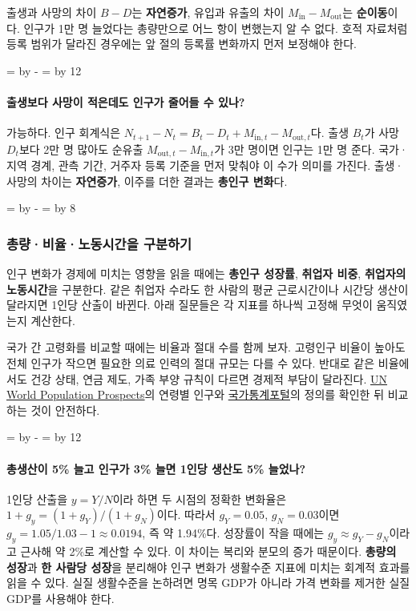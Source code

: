 \documentclass[10pt,a4paper]{article}
\newcommand{\ReserveQuestionSpace}{%
  \par\begingroup
  \dimen0=\pagegoal \advance\dimen0 by -\pagetotal
  \dimen2=\baselineskip \multiply\dimen2 by 12
  \ifdim\dimen0<\dimen2 \newpage\fi
  \endgroup}
\newcommand{\ReserveReadingSectionSpace}{%
  \par\begingroup
  \dimen0=\pagegoal \advance\dimen0 by -\pagetotal
  \dimen2=\baselineskip \multiply\dimen2 by 8
  \ifdim\dimen0<\dimen2 \newpage\fi
  \endgroup}
\begin{document}
출생과 사망의 차이 $B-D$는 \textbf{자연증가}, 유입과 유출의 차이 $M_{\mathrm{in}}-M_{\mathrm{out}}$는 \textbf{순이동}이다. 인구가 1만 명 늘었다는 총량만으로 어느 항이 변했는지 알 수 없다. 호적 자료처럼 등록 범위가 달라진 경우에는 앞 절의 등록률 변화까지 먼저 보정해야 한다.\par

\ReserveQuestionSpace
\paragraph{출생보다 사망이 적은데도 인구가 줄어들 수 있나?}
가능하다. 인구 회계식은 $N_{t+1}-N_t=B_t-D_t+M_{\mathrm{in},t}-M_{\mathrm{out},t}$다. 출생 $B_t$가 사망 $D_t$보다 2만 명 많아도 순유출 $M_{\mathrm{out},t}-M_{\mathrm{in},t}$가 3만 명이면 인구는 1만 명 준다. 국가·지역 경계, 관측 기간, 거주자 등록 기준을 먼저 맞춰야 이 수가 의미를 가진다. 출생·사망의 차이는 \textbf{자연증가}, 이주를 더한 결과는 \textbf{총인구 변화}다.\par

\ReserveReadingSectionSpace
\subsubsection*{총량·비율·노동시간을 구분하기}

인구 변화가 경제에 미치는 영향을 읽을 때에는 \textbf{총인구 성장률}, \textbf{취업자 비중}, \textbf{취업자의 노동시간}을 구분한다. 같은 취업자 수라도 한 사람의 평균 근로시간이나 시간당 생산이 달라지면 1인당 산출이 바뀐다. 아래 질문들은 각 지표를 하나씩 고정해 무엇이 움직였는지 계산한다.\par

국가 간 고령화를 비교할 때에는 비율과 절대 수를 함께 보자. 고령인구 비율이 높아도 전체 인구가 작으면 필요한 의료 인력의 절대 규모는 다를 수 있다. 반대로 같은 비율에서도 건강 상태, 연금 제도, 가족 부양 규칙이 다르면 경제적 부담이 달라진다. \href{https://population.un.org/wpp/}{UN World Population Prospects}의 연령별 인구와 \href{https://kosis.kr/}{국가통계포털}의 정의를 확인한 뒤 비교하는 것이 안전하다.\par

\ReserveQuestionSpace
\paragraph{총생산이 5\% 늘고 인구가 3\% 늘면 1인당 생산도 5\% 늘었나?}
1인당 산출을 $y=Y/N$이라 하면 두 시점의 정확한 변화율은 $1+g_y=(1+g_Y)/(1+g_N)$이다. 따라서 $g_Y=0.05$, $g_N=0.03$이면 $g_y=1.05/1.03-1\approx0.0194$, 즉 약 1.94\%다. 성장률이 작을 때에는 $g_y\approx g_Y-g_N$이라고 근사해 약 2\%로 계산할 수 있다. 이 차이는 복리와 분모의 증가 때문이다. \textbf{총량의 성장}과 \textbf{한 사람당 성장}을 분리해야 인구 변화가 생활수준 지표에 미치는 회계적 효과를 읽을 수 있다. 실질 생활수준을 논하려면 명목 GDP가 아니라 가격 변화를 제거한 실질 GDP를 사용해야 한다.\par
\end{document}
